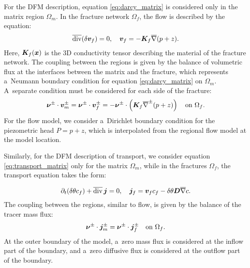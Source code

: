 For the DFM description, equation \eqref{eq:darcy_matrix} is considered only in
the matrix region $\Omega_m$. In the fracture network $\Omega_f$, the flow is
described by the equation:
\begin{equation}
    \label{eq:darcy_fracture}
    \overline{\mathop{\mathrm{div}}\nolimits} (\delta {\bm{v}}_f) = 0, \quad {\bm{v}}_f = -{\bm{K}}_f \overline{\nabla} (p + z).
\end{equation}
Here, ${\bm{K}}_f({\bm{x}})$ is the 3D conductivity tensor describing the material of
the fracture network. The coupling between the regions is given by the balance
of volumetric flux at the interfaces between the matrix and the fracture, which
represents a~Neumann boundary condition for equation \eqref{eq:darcy_matrix} on
$\Omega_m$. A~separate condition must be considered for each side of the
fracture:
\begin{equation}
    {\bm{\nu}}^{\pm} \cdot {\bm{v}}_m^\pm = {\bm{\nu}}^{\pm} \cdot {\bm{v}}_f^\pm =
    -{\bm{\nu}}^\pm \cdot \left({\bm{K}}_f \overline{\nabla}^\pm (p + z)\right)
    \quad \text{on }\Omega_f.
\end{equation}
For the flow model, we consider a~Dirichlet boundary condition for the
piezometric head $P = p + z$, which is interpolated from the regional flow
model at the model location.

Similarly, for the DFM description of transport, we consider
equation \eqref{eq:transport_matrix} only for the matrix $\Omega_m$,
while in the fractures $\Omega_f$, the transport equation takes the form:

\begin{equation}
   \label{eq:transport_fr}
   \partial_t (\delta\theta c_f) + \overline{\mathop{\mathrm{div}}\nolimits} \,{\bm{j}} = 0, \quad
   {\bm{j}}_f = {\bm{v}}_f c_f - \delta \theta {\bm{D}} \overline{\nabla} c.
\end{equation}
The coupling between the regions, similar to flow, is given by the balance of
the tracer mass flux:
\begin{equation}
    {\bm{\nu}}^{\pm} \cdot {\bm{j}}_m^\pm  = {\bm{\nu}}^{\pm} \cdot {\bm{j}}_f^\pm
    \quad \text{on }\Omega_f.
\end{equation}
At the outer boundary of the model, a~zero mass flux is considered at the
inflow part of the boundary, and a~zero diffusive flux is considered at the
outflow part of the boundary.

\def\rmin{\underline r}
\def\rmax{\overline r}
